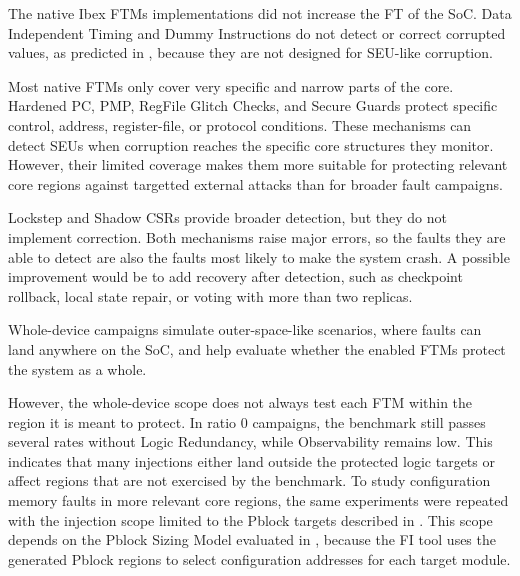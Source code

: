 The native Ibex \acp{FTM} implementations did not increase the \ac{FT} of the \ac{SoC}. Data Independent Timing and Dummy Instructions do not detect or correct corrupted values, as predicted in , because they are not designed for \ac{SEU}-like corruption. 

Most native \acp{FTM} only cover very specific and narrow parts of the core. Hardened \ac{PC}, PMP, RegFile Glitch Checks, and Secure Guards protect specific control, address, register-file, or protocol conditions. These mechanisms can detect \acp{SEU} when corruption reaches the specific core structures they monitor. However, their limited coverage makes them more suitable for protecting relevant core regions against targetted external attacks than for broader fault campaigns.

Lockstep and Shadow \acp{CSR} provide broader detection, but they do not implement correction. Both mechanisms raise major errors, so the faults they are able to detect are also the faults most likely to make the system crash. A possible improvement would be to add recovery after detection, such as checkpoint rollback, local state repair, or voting with more than two replicas.

Whole-device campaigns simulate outer-space-like scenarios, where faults can land anywhere on the \ac{SoC}, and help evaluate whether the enabled \acp{FTM} protect the system as a whole.

However, the whole-device scope does not always test each \ac{FTM} within the region it is meant to protect. In ratio 0 campaigns, the benchmark still passes several rates without Logic Redundancy, while Observability remains low. This indicates that many injections either land outside the protected logic targets or affect regions that are not exercised by the benchmark. To study configuration memory faults in more relevant core regions, the same experiments were repeated with the injection scope limited to the Pblock targets described in . This scope depends on the Pblock Sizing Model evaluated in , because the \ac{FI} tool uses the generated Pblock regions to select configuration addresses for each target module.



